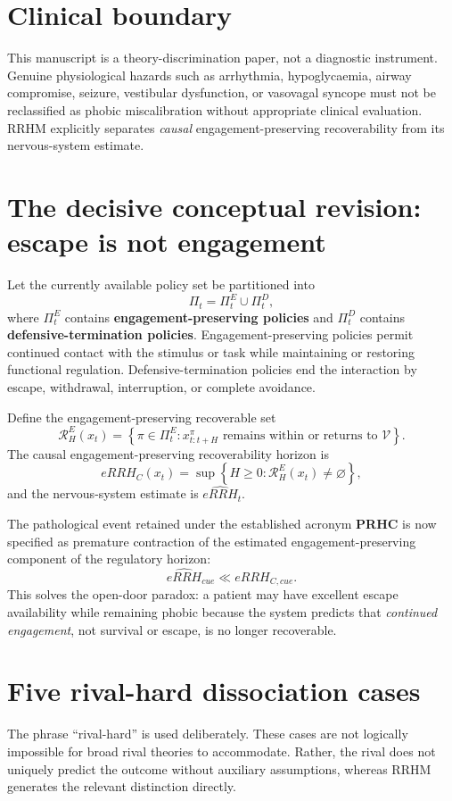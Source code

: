 \documentclass[10pt]{article}
\begin{document}
\section{Clinical boundary}
This manuscript is a theory-discrimination paper, not a diagnostic instrument. Genuine physiological hazards such as arrhythmia, hypoglycaemia, airway compromise, seizure, vestibular dysfunction, or vasovagal syncope must not be reclassified as phobic miscalibration without appropriate clinical evaluation. RRHM explicitly separates \emph{causal} engagement-preserving recoverability from its nervous-system estimate.

\section{The decisive conceptual revision: escape is not engagement}
Let the currently available policy set be partitioned into
\[
\Pi_t=\Pi_t^{E}\cup\Pi_t^{D},
\]
where $\Pi_t^{E}$ contains \textbf{engagement-preserving policies} and $\Pi_t^{D}$ contains \textbf{defensive-termination policies}. Engagement-preserving policies permit continued contact with the stimulus or task while maintaining or restoring functional regulation. Defensive-termination policies end the interaction by escape, withdrawal, interruption, or complete avoidance.

Define the engagement-preserving recoverable set
\[
\mathcal R_H^{E}(x_t)=\left\{\pi\in\Pi_t^{E}:x_{t:t+H}^{\pi}\text{ remains within or returns to }\mathcal V\right\}.
\]
The causal engagement-preserving recoverability horizon is
\[
eRRH_C(x_t)=\sup\left\{H\ge0:\mathcal R_H^{E}(x_t)\neq\varnothing\right\},
\]
and the nervous-system estimate is $\widehat{eRRH}_t$.

The pathological event retained under the established acronym \textbf{PRHC} is now specified as premature contraction of the estimated engagement-preserving component of the regulatory horizon:
\[
\widehat{eRRH}_{cue}\ll eRRH_{C,cue}.
\]
This solves the open-door paradox: a patient may have excellent escape availability while remaining phobic because the system predicts that \emph{continued engagement}, not survival or escape, is no longer recoverable.

\section{Five rival-hard dissociation cases}
The phrase ``rival-hard'' is used deliberately. These cases are not logically impossible for broad rival theories to accommodate. Rather, the rival does not uniquely predict the outcome without auxiliary assumptions, whereas RRHM generates the relevant distinction directly.
\end{document}
